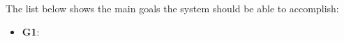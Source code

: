 The list below shows the main goals the system should be able to accomplish:

\begin{itemize}
    \item \textbf{G1}: 
\end{itemize}



